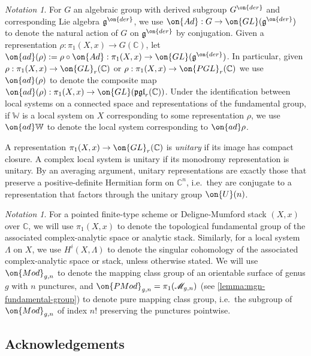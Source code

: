 \documentclass[12 pt]{amsart}
\theoremstyle{plain}
\theoremstyle{definition}
\theoremstyle{remark}
\newtheorem{notation}[subsubsection]{Notation}
\numberwithin{equation}{section}
\begin{document}
\begin{notation}
	\label{notation:adjoint}
	For $G$ an algebraic group with derived subgroup $G^{\on{der}}$ and
corresponding Lie algebra $\mathfrak g^{\on{der}}$, we use
$\on{Ad} : G \to \on{GL}(\mathfrak g^{\on{der}})$
to denote the natural action of $G$ on $\mathfrak{g}^{\on{der}}$ by conjugation.
Given a representation $\rho: \pi_1(X, x) \to G(\mathbb C)$, let $\on{ad}(\rho)
:= \rho \circ \on{Ad}: \pi_1(X, x) \to \on{GL}(\mathfrak g^{\on{der}})$. 
In particular, given
$\rho : \pi_1(X, x) \to \on{GL}_r(\mathbb C)$ or 
$\rho : \pi_1(X, x) \to \on{PGL}_r(\mathbb C)$
we use $\on{ad}(\rho)$ to denote the composite map
$\on{ad}(\rho) : \pi_1(X, x) \to \on{GL}(\mathfrak {pgl}_r(\mathbb C))$.
Under the identification between local systems on a connected space and representations of the
fundamental group, if $\mathbb W$ is a local system on $X$ corresponding to some representation $\rho$, 
we use $\on{ad}\mathbb W$ to denote the local system corresponding to
$\on{ad}\rho$.

A representation $\pi_1(X,x)\to \on{GL}_r(\mathbb{C})$ is \emph{unitary} if its image has
compact closure. 
A complex local system is unitary if its monodromy representation is unitary. By
an averaging argument, unitary representations are exactly those that preserve a positive-definite Hermitian form on $\mathbb{C}^n$, i.e.~they are conjugate to a representation that factors through the unitary group $\on{U}(n)$.
\end{notation}

\begin{notation}
For a pointed finite-type scheme or Deligne-Mumford stack $(X, x)$ over
$\mathbb{C}$, we will use $\pi_1(X, x)$ to denote the topological fundamental group 
 of the associated complex-analytic space or analytic stack.
Similarly, for a local system $\Lambda$ on $X$, we use
$H^i(X, \Lambda)$ to denote the singular cohomology of the associated complex-analytic space or stack, unless otherwise stated. We will use $\on{Mod}_{g,n}$ to denote the mapping class group of an orientable surface of genus $g$ with $n$ punctures, and $\on{PMod}_{g,n}=\pi_1(\mathscr{M}_{g,n})$ 
(see \autoref{lemma:mgn-fundamental-group})
to denote pure mapping class group, i.e.~the subgroup of $\on{Mod}_{g,n}$ of index $n!$ preserving the punctures pointwise.
\end{notation}

\subsection{Acknowledgements}
\end{document}
